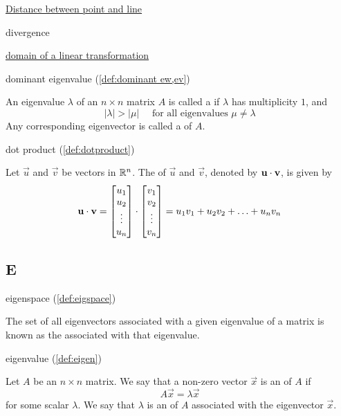 \documentclass{ximera}
\begin{document}
\href{https://ximera.osu.edu/oerlinalg/LinearAlgebra/VEC-0070/main}{Distance between point and line}

divergence

\href{https://ximera.osu.edu/oerlinalg/LinearAlgebra/LTR-0010/main}{domain of a linear transformation} 

dominant eigenvalue (\ref{def:dominant ew,ev})
\begin{expandable}
    An eigenvalue $\lambda$ of an $n \times n$ matrix $A$ is called a  if $\lambda$ has multiplicity $1$, and
\begin{equation*}
|\lambda| > |\mu| \quad \mbox{ for all eigenvalues } \mu \neq \lambda
\end{equation*}
Any corresponding eigenvector is called a  of $A$.
\end{expandable}

dot product (\ref{def:dotproduct})
\begin{expandable}
  Let $\vec{u}$ and $\vec{v}$ be vectors in $\mathbb{R}^n$.  The  of $\vec{u}$ and $\vec{v}$, denoted by
  $\mathbf{u}\cdot \mathbf{v}$, is given by
$$\mathbf{u}\cdot\mathbf{v}=\begin{bmatrix}u_1\\u_2\\\vdots\\u_n\end{bmatrix}\cdot\begin{bmatrix}v_1\\v_2\\\vdots\\v_n\end{bmatrix}=u_1v_1+u_2v_2+\ldots+u_nv_n$$
\end{expandable}


\subsection{E}

eigenspace (\ref{def:eigspace})
\begin{expandable}
    The set of all eigenvectors associated with a given eigenvalue of a matrix is known as the  associated with that eigenvalue.
\end{expandable}

eigenvalue (\ref{def:eigen})
\begin{expandable}
    Let $A$ be an $n \times n$ matrix.  We say that a non-zero vector $\vec{x}$ is an  of $A$ if $$A\vec{x} = \lambda \vec{x}$$
for some scalar $\lambda$.
We say that $\lambda$ is an  of $A$ associated with the eigenvector $\vec{x}$.
\end{expandable}
\end{document}

